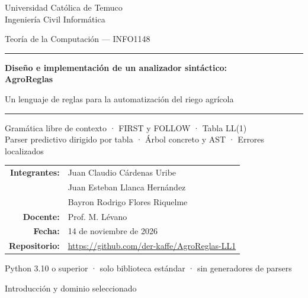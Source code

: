 \documentclass[11pt,letterpaper]{article}
\makeatletter
\renewcommand\section{\@startsection{section}{1}{\z@}{-3.2ex \@plus -1ex \@minus -.2ex}{1.6ex \@plus .2ex}%
  {\normalfont\Large\bfseries\color{acento}}}
\makeatother
\begin{document}
\begin{titlepage}
\centering
{\large Universidad Católica de Temuco\\[2pt] Ingeniería Civil Informática\par}
\vspace{0.6cm}
{\large Teoría de la Computación --- INFO1148\par}
\vspace{2.6cm}
{\color{acento}\rule{0.75\linewidth}{1pt}\par}
\vspace{0.5cm}
{\LARGE\bfseries Diseño e implementación de un analizador sintáctico:\\[6pt] AgroReglas\par}
\vspace{0.4cm}
{\large Un lenguaje de reglas para la automatización del riego agrícola\par}
\vspace{0.5cm}
{\color{acento}\rule{0.75\linewidth}{1pt}\par}
\vspace{0.8cm}
{\normalsize Gramática libre de contexto · FIRST y FOLLOW · Tabla LL(1)\\
Parser predictivo dirigido por tabla · Árbol concreto y AST · Errores localizados\par}
\vfill
\begin{tabular}{rl}
\textbf{Integrantes:} & Juan Claudio Cárdenas Uribe\\
 & Juan Esteban Llanca Hernández\\
 & Bayron Rodrigo Flores Riquelme\\[8pt]
\textbf{Docente:} & Prof. M. Lévano\\[8pt]
\textbf{Fecha:} & 14 de noviembre de 2026\\[8pt]
\textbf{Repositorio:} & \url{https://github.com/der-kaffe/AgroReglas-LL1}
\end{tabular}
\vfill
{\small\color{gris}Python 3.10 o superior · solo biblioteca estándar · sin generadores de parsers\par}
\end{titlepage}

\begingroup\setlength{\parskip}{1pt}\tableofcontents\endgroup
\clearpage

\section{Introducción y dominio seleccionado}\label{sec:intro}
\end{document}

